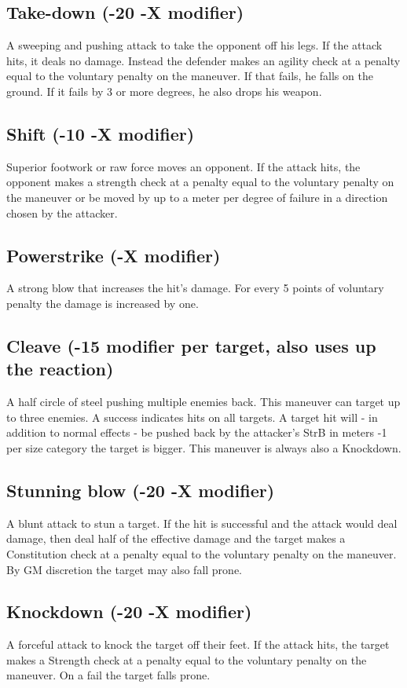 \documentclass[12pt,a4paper]{book}
\begin{document}
	\subsection*{Take-down (-20 -X modifier)}
	A sweeping and pushing attack to take the opponent off his legs. If the attack hits, it deals no damage. Instead the defender makes an agility check at a penalty equal to the voluntary penalty on the maneuver. If that fails, he falls on the ground. If it fails by 3 or more degrees, he also drops his weapon.
	\subsection*{Shift (-10 -X modifier)}
	Superior footwork or raw force moves an opponent. If the attack hits, the opponent makes a strength check at a penalty equal to the voluntary penalty on the maneuver or be moved by up to a meter per degree of failure in a direction chosen by the attacker.
	\subsection*{Powerstrike (-X modifier)}
	A strong blow that increases the hit’s damage. For every 5 points of voluntary penalty the damage is increased by one.
	\subsection*{Cleave (-15 modifier per target, also uses up the reaction)}
	A half circle of steel pushing multiple enemies back. This maneuver can target up to three enemies. A success indicates hits on all targets. A target hit will - in addition to normal effects - be pushed back by the attacker’s StrB in meters -1 per size category the target is bigger. This maneuver is always also a Knockdown.
	\subsection*{Stunning blow (-20 -X modifier)}
	A blunt attack to stun a target. If the hit is successful and the attack would deal damage, then deal half of the effective damage and the target makes a Constitution check at a penalty equal to the voluntary penalty on the maneuver. By GM discretion the target may also fall prone.
	\subsection*{Knockdown (-20 -X modifier)}
	A forceful attack to knock the target off their feet. If the attack hits, the target makes a Strength check at a penalty equal to the voluntary penalty on the maneuver. On a fail the target falls prone.
\end{document}
